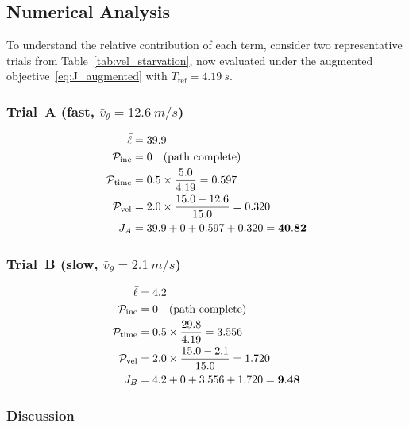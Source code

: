 \subsection{Numerical Analysis}
\label{sec:numerical_analysis}

To understand the relative contribution of each term, consider
two representative trials from Table~\ref{tab:vel_starvation},
now evaluated under the augmented objective~\eqref{eq:J_augmented}
with $T_{\text{ref}} = \SI{4.19}{s}$.

\subsubsection{Trial~A (fast, $\bar{v}_\theta = \SI{12.6}{m/s}$)}

\begin{align}
  \bar\ell &= 39.9  \notag \\
  \mathcal{P}_{\text{inc}} &= 0
    \quad (\text{path complete}) \notag \\
  \mathcal{P}_{\text{time}}
    &= 0.5 \times \frac{5.0}{4.19} = 0.597 \notag \\
  \mathcal{P}_{\text{vel}}
    &= 2.0 \times \frac{15.0 - 12.6}{15.0} = 0.320 \notag \\
  J_A &= 39.9 + 0 + 0.597 + 0.320 = \mathbf{40.82}
  \label{eq:JA}
\end{align}

\subsubsection{Trial~B (slow, $\bar{v}_\theta = \SI{2.1}{m/s}$)}

\begin{align}
  \bar\ell &= 4.2  \notag \\
  \mathcal{P}_{\text{inc}} &= 0
    \quad (\text{path complete}) \notag \\
  \mathcal{P}_{\text{time}}
    &= 0.5 \times \frac{29.8}{4.19} = 3.556 \notag \\
  \mathcal{P}_{\text{vel}}
    &= 2.0 \times \frac{15.0 - 2.1}{15.0} = 1.720 \notag \\
  J_B &= 4.2 + 0 + 3.556 + 1.720 = \mathbf{9.48}
  \label{eq:JB}
\end{align}

\subsubsection{Discussion}

